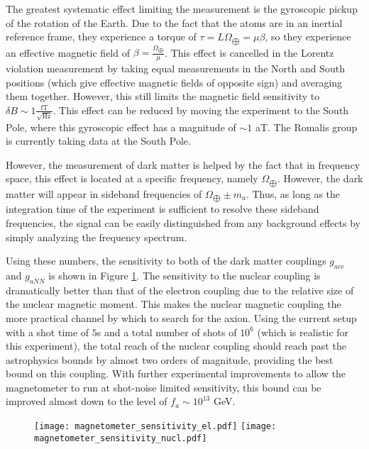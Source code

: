 \documentclass[aps,prd,final,letterpaper]{revtex4}
\begin{document}
The greatest systematic effect limiting the measurement is the gyroscopic pickup of the rotation of the Earth. Due to the fact that the atoms are in an inertial reference frame, they experience a torque of $\tau = L\Omega_{\bigoplus} = \mu \beta$, so they experience an effective magnetic field of $\beta = \frac{\Omega_{\bigoplus}}{\mu}$. This effect is cancelled in the Lorentz violation measurement by taking equal measurements in the North and South positions (which give effective magnetic fields of opposite sign) and averaging them together. However, this still limits the magnetic field sensitivity to $\delta B \sim 1 \frac{\mathrm{fT}}{\sqrt{\mathrm{Hz}}}$. This effect can be reduced by moving the experiment to the South Pole, where this gyroscopic effect has a magnitude of $\sim 1$ aT. The Romalis group is currently taking data at the South Pole.

However, the measurement of dark matter is helped by the fact that in frequency space, this effect is located at a specific frequency, namely $\Omega_{\bigoplus}$. However, the dark matter will appear in sideband frequencies of $\Omega_{\bigoplus} \pm m_a$. Thus, as long as the integration time of the experiment is sufficient to resolve these sideband frequencies, the signal can be easily distinguished from any background effects by simply analyzing the frequency spectrum. 

Using these numbers, the sensitivity to both of the dark matter couplings $g_{aee}$ and $g_{aNN}$ is shown in Figure \ref{fig:mag_sensitivity}. The sensitivity to the nuclear coupling is dramatically better than that of the electron coupling due to the relative size of the nuclear magnetic moment. This makes the nuclear magnetic coupling the more practical channel by which to search for the axion. Using the current setup with a shot time of $5$s and a total number of shots of $10^6$ (which is realistic for this experiment), the total reach of the nuclear coupling should reach past the astrophysics bounds by almost two orders of magnitude, providing the best bound on this coupling. With further experimental improvements to allow the magnetometer to run at shot-noise limited sensitivity, this bound can be improved almost down to the level of $f_a \sim 10^{13}$ GeV. 


\begin{figure}
\texttt{[image: magnetometer\_sensitivity\_el.pdf]}
\texttt{[image: magnetometer\_sensitivity\_nucl.pdf]}
\label{fig:mag_sensitivity}
\end{figure}
\end{document}
